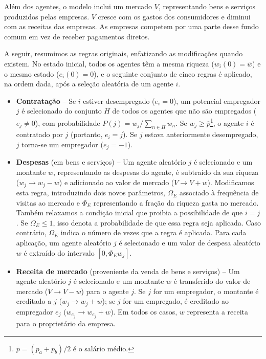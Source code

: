 Além dos agentes, o modelo inclui um mercado $V$, representando bens e serviços produzidos pelas empresas. $V$ cresce com os gastos dos consumidores e diminui com as receitas das empresas. As empresas competem por uma parte desse fundo comum em vez de receber pagamentos diretos. 

A seguir, resumimos as regras originais, enfatizando as modificações quando existem. No estado inicial, todos os agentes têm a mesma riqueza ($w_i(0)=\overline{w}$) e o mesmo estado ($e_i(0)=0$), e o seguinte conjunto de cinco regras é aplicado, na ordem dada, após a seleção aleatória de um agente $i$.

\begin{itemize}

\item   \textbf{Contratação} -- Se $i$ estiver desempregado ($e_i=0$), um potencial empregador $j$ é selecionado do conjunto $H$  de todos os agentes que não são empregados ($e_j \neq 0$), com  probabilidade  $P (j)= w_{j}/\sum_{n\in H}w_{n}$.   Se $ w_j \ge \overline{p}$\footnote{$\overline{p}=(p_a+p_b)/2$ é o salário médio.}, o agente $i$ é contratado por $j$ (portanto, $e_i=j$).    Se $j$ estava anteriormente desempregado, $j$ torna-se um empregador ($e_j=-1$).

\item    \textbf{Despesas} (em bens e serviços) -- Um agente aleatório $j$ é selecionado e um montante $w$, representando as despesas do agente, é subtraído da sua riqueza ($w_j \to w_j-w$) e adicionado ao valor de mercado ($V \to V+w$). Modificamos esta regra, introduzindo dois novos parâmetros,  $\Omega_E$ associado à frequência de visitas ao mercado e $\Phi_E$ representando a fração da riqueza gasta no mercado. Também relaxamos a condição inicial que proibia a possibilidade de que $i=j$.
%
Se $\Omega_E\leq1$, isso denota a probabilidade de que essa regra seja aplicada.  
Caso contrário, $\Omega_E$ indica o número de vezes que a regra é aplicada. 
Para cada aplicação, um agente aleatório $j$ é selecionado e um valor de despesa aleatório $w$ é extraído do intervalo $\left[0,\Phi_E w_j\right]$. 
 
\item \textbf{Receita de mercado} (proveniente da venda de bens e serviços) -- 
Um agente aleatório $j$ é selecionado e um montante $w$ é  transferido do valor de mercado ($V \to V - w$) para o agente $j$.  Se $j$ for um empregador, o montante é creditado a $j$ ($w_j \to w_j + w$); se $j$ for um empregado, é creditado ao empregador $e_j$  ($w_{e_j} \to w_{e_j} + w$).  Em todos os casos,  $w$ representa a receita para o proprietário da empresa.


\end{itemize}
